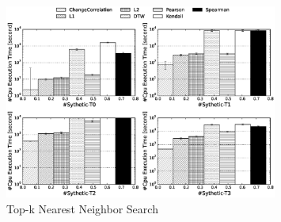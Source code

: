 \begin{figure}[t]
\centering
\includegraphics[width=0.8\textwidth]{SythClusPerf.eps}
\caption{Top-k Nearest Neighbor Search}
\label{Fig:ClusPerf}
\end{figure}

